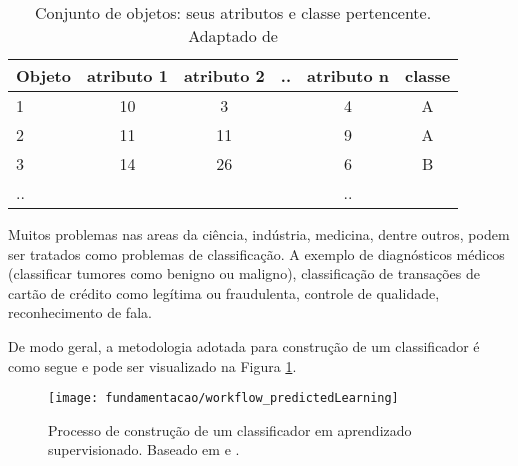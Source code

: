 \begin{table}[!htp]
  \centering
  \begin{tabular}{ |l|c c c c |c|}
    \hline
       {\bf Objeto} & {\bf atributo 1} & {\bf atributo 2} & {\bf ..} & {\bf atributo n} & {\bf classe} \\
    \hline
       1 & 10 & 3 &  & 4 & A \\
    \hline
       2 & 11 & 11 &  & 9 & A \\
    \hline
       3 & 14 & 26 &  & 6 & B \\
    \hline
       .. &  &  &  & .. & \\
    \hline
  \end{tabular}
  \caption{Conjunto de objetos: seus atributos e classe pertencente. Adaptado de \cite{Kotsiantis:2007}}
  \label{table:dsex1}
\end{table}

Muitos problemas nas areas da ciência, indústria, medicina, dentre outros, podem ser tratados como problemas de classificação. A exemplo de diagnósticos médicos (classificar tumores como benigno ou maligno), classificação de transações de cartão de crédito como legítima ou fraudulenta, controle de qualidade, reconhecimento de fala.\cite{Zhang:2000} 

De modo geral, a metodologia adotada para construção de um classificador é como segue e pode ser visualizado na Figura \ref{fig:slclassification}.

\begin{figure}[!htb] \centering 
  \centering
  \texttt{[image: fundamentacao/workflow\_predictedLearning]} 
  \caption{Processo de construção de um classificador em aprendizado supervisionado. Baseado em \cite{Kotsiantis:2007} e .} 
  \label{fig:slclassification}
\end{figure}

